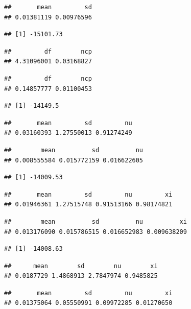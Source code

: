 \documentclass[a4paper, twoside]{templates/ociamthesis}
\begin{document}
\begin{verbatim}
##       mean         sd 
## 0.01381119 0.00976596
\end{verbatim}

\begin{verbatim}
## [1] -15101.73
\end{verbatim}

\begin{verbatim}
##         df        ncp 
## 4.31096001 0.03168827
\end{verbatim}

\begin{verbatim}
##         df        ncp 
## 0.14857777 0.01100453
\end{verbatim}

\begin{verbatim}
## [1] -14149.5
\end{verbatim}

\begin{verbatim}
##       mean         sd         nu 
## 0.03160393 1.27550013 0.91274249
\end{verbatim}

\begin{verbatim}
##        mean          sd          nu 
## 0.008555584 0.015772159 0.016622605
\end{verbatim}

\begin{verbatim}
## [1] -14009.53
\end{verbatim}

\begin{verbatim}
##       mean         sd         nu         xi 
## 0.01946361 1.27515748 0.91513166 0.98174821
\end{verbatim}

\begin{verbatim}
##        mean          sd          nu          xi 
## 0.013176090 0.015786515 0.016652983 0.009638209
\end{verbatim}

\begin{verbatim}
## [1] -14008.63
\end{verbatim}

\begin{verbatim}
##      mean        sd        nu        xi 
## 0.0187729 1.4868913 2.7847974 0.9485825
\end{verbatim}

\begin{verbatim}
##       mean         sd         nu         xi 
## 0.01375064 0.05550991 0.09972285 0.01270650
\end{verbatim}
\end{document}
